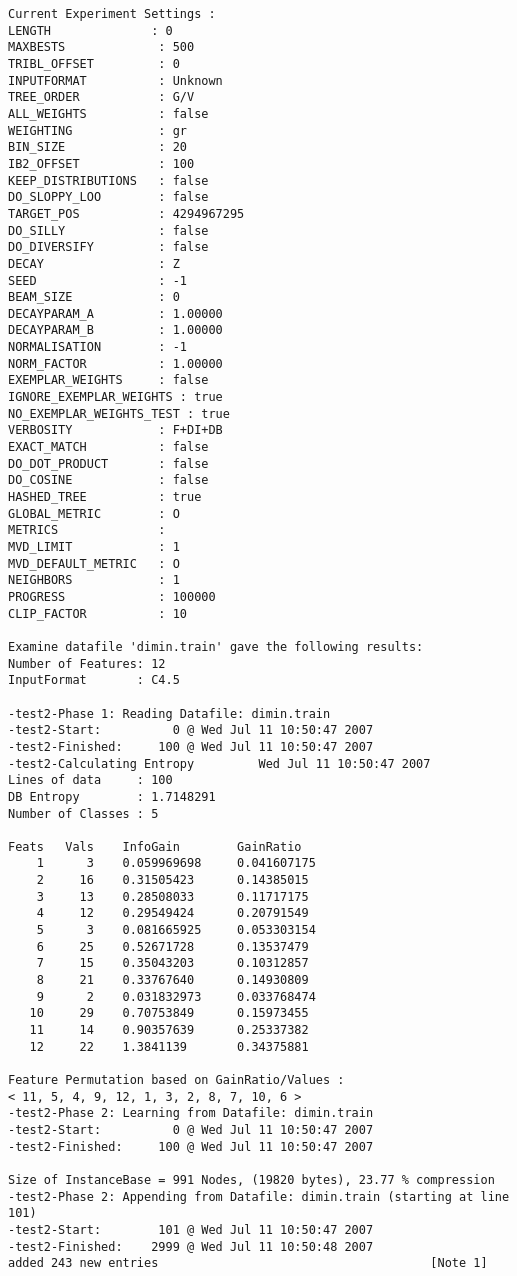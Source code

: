 \documentclass{report}
\begin{document}
\begin{footnotesize}
\begin{verbatim}
Current Experiment Settings :
LENGTH              : 0
MAXBESTS             : 500
TRIBL_OFFSET         : 0
INPUTFORMAT          : Unknown
TREE_ORDER           : G/V
ALL_WEIGHTS          : false
WEIGHTING            : gr
BIN_SIZE             : 20
IB2_OFFSET           : 100
KEEP_DISTRIBUTIONS   : false
DO_SLOPPY_LOO        : false
TARGET_POS           : 4294967295
DO_SILLY             : false
DO_DIVERSIFY         : false
DECAY                : Z
SEED                 : -1
BEAM_SIZE            : 0
DECAYPARAM_A         : 1.00000
DECAYPARAM_B         : 1.00000
NORMALISATION        : -1
NORM_FACTOR          : 1.00000
EXEMPLAR_WEIGHTS     : false
IGNORE_EXEMPLAR_WEIGHTS : true
NO_EXEMPLAR_WEIGHTS_TEST : true
VERBOSITY            : F+DI+DB
EXACT_MATCH          : false
DO_DOT_PRODUCT       : false
DO_COSINE            : false
HASHED_TREE          : true
GLOBAL_METRIC        : O
METRICS              :
MVD_LIMIT            : 1
MVD_DEFAULT_METRIC   : O
NEIGHBORS            : 1
PROGRESS             : 100000
CLIP_FACTOR          : 10

Examine datafile 'dimin.train' gave the following results:
Number of Features: 12
InputFormat       : C4.5

-test2-Phase 1: Reading Datafile: dimin.train
-test2-Start:          0 @ Wed Jul 11 10:50:47 2007
-test2-Finished:     100 @ Wed Jul 11 10:50:47 2007
-test2-Calculating Entropy         Wed Jul 11 10:50:47 2007
Lines of data     : 100
DB Entropy        : 1.7148291
Number of Classes : 5

Feats   Vals    InfoGain        GainRatio
    1      3    0.059969698     0.041607175
    2     16    0.31505423      0.14385015
    3     13    0.28508033      0.11717175
    4     12    0.29549424      0.20791549
    5      3    0.081665925     0.053303154
    6     25    0.52671728      0.13537479
    7     15    0.35043203      0.10312857
    8     21    0.33767640      0.14930809
    9      2    0.031832973     0.033768474
   10     29    0.70753849      0.15973455
   11     14    0.90357639      0.25337382
   12     22    1.3841139       0.34375881

Feature Permutation based on GainRatio/Values :
< 11, 5, 4, 9, 12, 1, 3, 2, 8, 7, 10, 6 >
-test2-Phase 2: Learning from Datafile: dimin.train
-test2-Start:          0 @ Wed Jul 11 10:50:47 2007
-test2-Finished:     100 @ Wed Jul 11 10:50:47 2007

Size of InstanceBase = 991 Nodes, (19820 bytes), 23.77 % compression
-test2-Phase 2: Appending from Datafile: dimin.train (starting at line 101)
-test2-Start:        101 @ Wed Jul 11 10:50:47 2007
-test2-Finished:    2999 @ Wed Jul 11 10:50:48 2007
added 243 new entries                                      [Note 1]


\end{verbatim}
\end{footnotesize}
\end{document}
